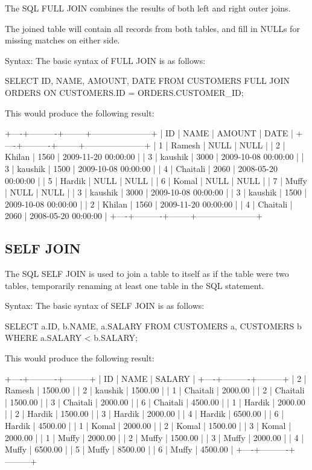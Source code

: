 The SQL FULL JOIN combines the results of both left and right outer joins.

The joined table will contain all records from both tables, and fill in NULLs for missing matches on either side.

Syntax:
The basic syntax of FULL JOIN is as follows:

\begin{Code}
	SELECT  ID, NAME, AMOUNT, DATE
	FROM CUSTOMERS
	FULL JOIN ORDERS
	ON CUSTOMERS.ID = ORDERS.CUSTOMER_ID;
\end{Code}

This would produce the following result:

\begin{Code}
	+----+----------+--------+---------------------+
	| ID | NAME     | AMOUNT | DATE                |
	+----+----------+--------+---------------------+
	|  1 | Ramesh   |   NULL | NULL                |
	|  2 | Khilan   |   1560 | 2009-11-20 00:00:00 |
	|  3 | kaushik  |   3000 | 2009-10-08 00:00:00 |
	|  3 | kaushik  |   1500 | 2009-10-08 00:00:00 |
	|  4 | Chaitali |   2060 | 2008-05-20 00:00:00 |
	|  5 | Hardik   |   NULL | NULL                |
	|  6 | Komal    |   NULL | NULL                |
	|  7 | Muffy    |   NULL | NULL                |
	|  3 | kaushik  |   3000 | 2009-10-08 00:00:00 |
	|  3 | kaushik  |   1500 | 2009-10-08 00:00:00 |
	|  2 | Khilan   |   1560 | 2009-11-20 00:00:00 |
	|  4 | Chaitali |   2060 | 2008-05-20 00:00:00 |
	+----+----------+--------+---------------------+
\end{Code}

\subsection{SELF JOIN}

The SQL SELF JOIN is used to join a table to itself as if the table were two tables, temporarily renaming at least one table in the SQL statement.

Syntax:
The basic syntax of SELF JOIN is as follows:

\begin{Code}
	SELECT  a.ID, b.NAME, a.SALARY
	FROM CUSTOMERS a, CUSTOMERS b
	WHERE a.SALARY < b.SALARY;
\end{Code}

This would produce the following result:

\begin{Code}
	+----+----------+---------+
	| ID | NAME     | SALARY  |
	+----+----------+---------+
	|  2 | Ramesh   | 1500.00 |
	|  2 | kaushik  | 1500.00 |
	|  1 | Chaitali | 2000.00 |
	|  2 | Chaitali | 1500.00 |
	|  3 | Chaitali | 2000.00 |
	|  6 | Chaitali | 4500.00 |
	|  1 | Hardik   | 2000.00 |
	|  2 | Hardik   | 1500.00 |
	|  3 | Hardik   | 2000.00 |
	|  4 | Hardik   | 6500.00 |
	|  6 | Hardik   | 4500.00 |
	|  1 | Komal    | 2000.00 |
	|  2 | Komal    | 1500.00 |
	|  3 | Komal    | 2000.00 |
	|  1 | Muffy    | 2000.00 |
	|  2 | Muffy    | 1500.00 |
	|  3 | Muffy    | 2000.00 |
	|  4 | Muffy    | 6500.00 |
	|  5 | Muffy    | 8500.00 |
	|  6 | Muffy    | 4500.00 |
	+----+----------+---------+
\end{Code}

